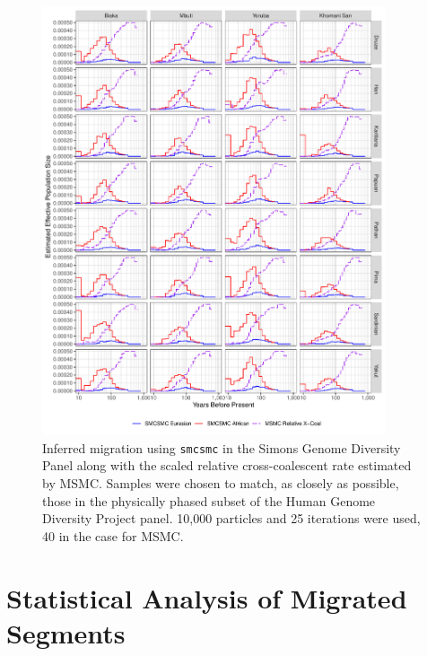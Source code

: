 \documentclass{article}
\begin{document}
\begin{figure}
	\centering
	\includegraphics[width=0.9\textwidth]{../plot/sgdp_subet_mig.pdf}
	\caption{Inferred migration using {\tt smcsmc} in the Simons Genome Diversity Panel along with the scaled relative cross-coalescent rate estimated by MSMC. Samples were chosen to match, as closely as possible, those in the physically phased subset of the Human Genome Diversity Project panel. 10,000 particles and 25 iterations were used, 40 in the case for MSMC.}
	\label{fig:hgdp_sgdp_mig}
\end{figure}


\section{Statistical Analysis of Migrated Segments} \label{dstats_section}
\end{document}
